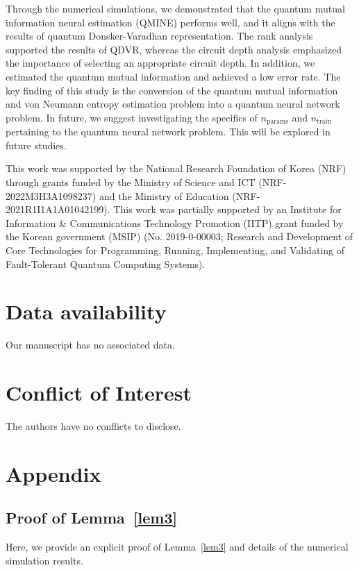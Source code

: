 \documentclass[aps,groupedaddress,superscriptaddress,amssymb,amsmath,amsbsy,amsfonts,twocolumn,pra]{revtex4}
\begin{document}
Through the numerical simulations, we demonstrated that the quantum mutual information neural estimation (QMINE) performs well, and it aligns with the results of quantum Donsker-Varadhan representation. The rank analysis supported the results of QDVR, whereas the circuit depth analysis emphasized the importance of selecting an appropriate circuit depth. In addition, we estimated the quantum mutual information and achieved a low error rate. The key finding of this study is the conversion of the quantum mutual information and von Neumann entropy estimation problem into a quantum neural network problem. In future, we suggest investigating the specifics of $n_\text{params}$ and $n_\text{train}$ pertaining to the quantum neural network problem. This will be explored in future studies.

\begin{acknowledgments}
This work was supported by the National Research Foundation of Korea (NRF) through grants funded by the Ministry of Science and ICT (NRF-2022M3H3A1098237) and the Ministry of Education (NRF-2021R1I1A1A01042199). This work was partially supported by an Institute for Information \& Communications Technology Promotion (IITP) grant funded by the Korean government (MSIP) (No. 2019-0-00003; Research and Development of Core Technologies for Programming, Running, Implementing, and Validating of Fault-Tolerant Quantum Computing Systems).
\end{acknowledgments}

\section*{Data availability}
Our manuscript has no associated data.

\section*{Conflict of Interest}
The authors have no conflicts to disclose.

\section{Appendix}
\subsection{Proof of Lemma~\ref{lem3}} \label{app:a}
Here, we provide an explicit proof of Lemma~\ref{lem3} and details of the numerical simulation results.
\end{document}
